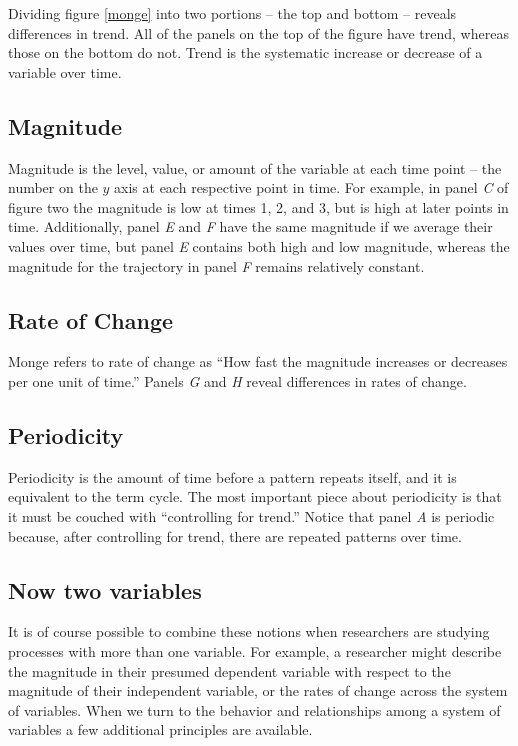 \documentclass[]{article}
\begin{document}
Dividing figure \ref{monge} into two portions -- the top and bottom --
reveals differences in trend. All of the panels on the top of the figure
have trend, whereas those on the bottom do not. Trend is the systematic
increase or decrease of a variable over time.

\hypertarget{magnitude}{%
\subsection{Magnitude}\label{magnitude}}

Magnitude is the level, value, or amount of the variable at each time
point -- the number on the \(y\) axis at each respective point in time.
For example, in panel \emph{C} of figure two the magnitude is low at
times 1, 2, and 3, but is high at later points in time. Additionally,
panel \emph{E} and \emph{F} have the same magnitude if we average their
values over time, but panel \emph{E} contains both high and low
magnitude, whereas the magnitude for the trajectory in panel \emph{F}
remains relatively constant.

\hypertarget{rate-of-change}{%
\subsection{Rate of Change}\label{rate-of-change}}

Monge refers to rate of change as ``How fast the magnitude increases or
decreases per one unit of time.'' Panels \emph{G} and \emph{H} reveal
differences in rates of change.

\hypertarget{periodicity}{%
\subsection{Periodicity}\label{periodicity}}

Periodicity is the amount of time before a pattern repeats itself, and
it is equivalent to the term cycle. The most important piece about
periodicity is that it must be couched with ``controlling for trend.''
Notice that panel \emph{A} is periodic because, after controlling for
trend, there are repeated patterns over time.

\hypertarget{now-two-variables}{%
\subsection{Now two variables}\label{now-two-variables}}

It is of course possible to combine these notions when researchers are
studying processes with more than one variable. For example, a
researcher might describe the magnitude in their presumed dependent
variable with respect to the magnitude of their independent variable, or
the rates of change across the system of variables. When we turn to the
behavior and relationships among a system of variables a few additional
principles are available.
\end{document}
